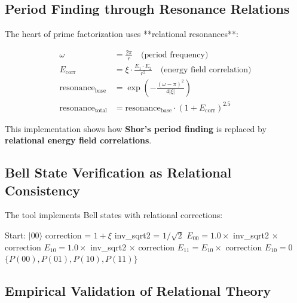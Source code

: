 	\subsection{Period Finding through Resonance Relations}
	
	The heart of prime factorization uses **relational resonances**:
	
	\begin{align}
		\omega &= \frac{2\pi}{r} \quad \text{(period frequency)} \\
		E_{\text{corr}} &= \xi \cdot \frac{E_1 \cdot E_2}{r^2} \quad \text{(energy field correlation)} \\
		\text{resonance}_{\text{base}} &= \exp\left(-\frac{(\omega - \pi)^2}{4|\xi|}\right) \\
		\text{resonance}_{\text{total}} &= \text{resonance}_{\text{base}} \cdot (1 + E_{\text{corr}})^{2.5}
	\end{align}
	
	This implementation shows how \textbf{Shor's period finding} is replaced by \textbf{relational energy field correlations}.
	
	\subsection{Bell State Verification as Relational Consistency}
	
	The tool implements Bell states with relational corrections:
	
	\begin{algorithm}[htbp]
		\caption{T0-Bell State Generation}
		\label{alg:bell_t0}
		\begin{algorithmic}[1]
			\STATE Start: $|00\rangle$
			\STATE correction = $1 + \xi$
			\STATE inv\_sqrt2 = $1/\sqrt{2}$
			\STATE 
			\STATE $E_{00} = 1.0 \times$ inv\_sqrt2 $\times$ correction
			\STATE $E_{10} = 1.0 \times$ inv\_sqrt2 $\times$ correction
			\STATE 
			\STATE $E_{11} = E_{10} \times$ correction
			\STATE $E_{10} = 0$
			\STATE 
			\RETURN $\{P(00), P(01), P(10), P(11)\}$
		\end{algorithmic}
	\end{algorithm}
	
	\subsection{Empirical Validation of Relational Theory}
	
